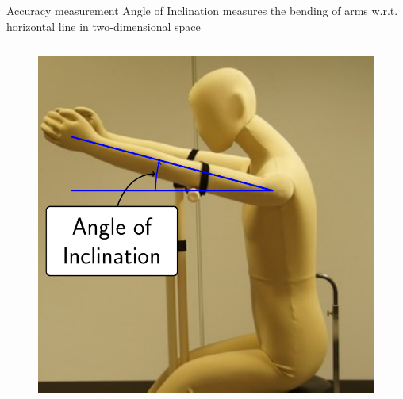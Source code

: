 \documentclass[aspectratio=43,11pt,xcolor={dvipsnames}]{beamer}
\begin{document}
\begin{frame}{Accuracy measurement}
	Angle of Inclination measures the bending of arms w.r.t. horizontal line in two-dimensional space
	\begin{columns}[t]
		\begin{column}{0.4\textwidth}
			\begin{figure}
				\includegraphics[width=\textwidth]{inclination_plus}
			\end{figure}
		\end{column}


\end{columns}
\end{frame}
\end{document}
